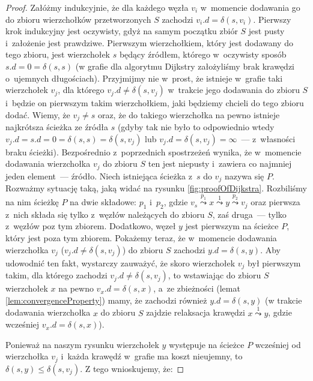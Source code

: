 \begin{proof}
\label{pr:dijkstra}
Załóżmy indukcyjnie, że dla każdego węzła $v_{i}$ w~momencie dodawania go do zbioru wierzchołków przetworzonych $S$ zachodzi $v_{i}.d = \delta \left( s, v_{i} \right)$. Pierwszy krok indukcyjny jest oczywisty, gdyż na samym początku zbiór $S$ jest pusty i~założenie jest prawdziwe. Pierwszym wierzchołkiem, który jest dodawany do tego zbioru, jest wierzchołek $s$ będący źródłem, którego w~oczywisty sposób $s.d = 0 = \delta \left( s, s \right)$ (w grafie dla algorytmu Dijkstry założyliśmy brak krawędzi o~ujemnych długościach). Przyjmijmy nie w~prost, że istnieje w~grafie taki wierzchołek $v_{j}$, dla którego $v_{j}.d \neq \delta \left( s, v_{j} \right)$ w~trakcie jego dodawania do zbioru $S$ i~będzie on pierwszym takim wierzchołkiem, jaki będziemy chcieli do tego zbioru dodać. Wiemy, że $v_{j} \neq s$ oraz, że do takiego wierzchołka na pewno istnieje najkrótsza ścieżka ze źródła $s$ (gdyby tak nie było to odpowiednio wtedy $v_{j}.d = s.d = 0 = \delta \left( s, s \right) = \delta \left( s, v_{j} \right)$ lub $v_{j}.d = \delta \left( s, v_{j} \right) = \infty $~--- z~własności braku ścieżki). Bezpośrednio z~poprzednich spostrzeżeń wynika, że w~momencie dodawania wierzchołka $v_{j}$ do zbioru $S$ ten jest niepusty i~zawiera co najmniej jeden element~--- źródło. Niech istniejąca ścieżka z~$s$ do $v_{j}$ nazywa się $P$. Rozważmy sytuację taką, jaką widać na rysunku \ref{fig:proofOfDijkstra}. Rozbiliśmy na nim ścieżkę $P$ na dwie składowe: $p_{1}$ i~$p_{2}$, gdzie $v_{s} \overset{p_{1}}\leadsto x \overset{1}\leadsto y \overset{p_{2}}\leadsto v_{j}$ oraz pierwsza z~nich składa się tylko z~węzłów należących do zbioru $S$, zaś druga~--- tylko z~węzłów poz tym zbiorem. Dodatkowo, węzeł $y$ jest pierwszym na ścieżce $P$, który jest poza tym zbiorem. Pokażemy teraz, że w~momencie dodawania wierzchołka $v_{j}$ ($v_{j}.d \neq \delta \left( s, v_{j} \right)$) do zbioru $S$ zachodzi $y.d = \delta \left( s, y \right)$. Aby udowodnić ten fakt, wystarczy zauważyć, że skoro wierzchołek $v_{j}$ był pierwszym takim, dla którego zachodzi $v_{j}.d \neq \delta \left( s, v_{j} \right)$, to wstawiając do zbioru $S$ wierzchołek $x$ na pewno $v_x.d = \delta \left( s, x \right)$, a~ze zbieżności (lemat \ref{lem:convergenceProperty}) mamy, że zachodzi również $y.d = \delta \left( s, y \right)$ (w trakcie dodawania wierzchołka $x$ do zbioru $S$ zajdzie relaksacja krawędzi $x \overset{1}\leadsto y$, gdzie wcześniej $v_x.d = \delta \left( s, x \right)$).

Ponieważ na naszym rysunku wierzchołek $y$ występuje na ścieżce $P$ wcześniej od wierzchołka $v_{j}$ i~każda krawędź w~grafie ma koszt nieujemny, to $ \delta \left( s, y \right) \leqslant \delta \left( s, v_{j} \right) $. Z tego wnioskujemy, że:


\end{proof}
